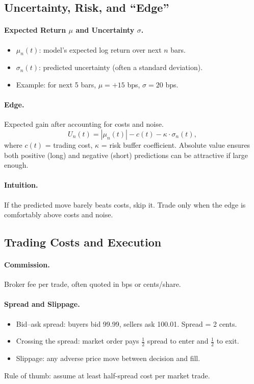 \documentclass[11pt]{article}
\begin{document}
    \subsection{Uncertainty, Risk, and ``Edge''}

    \paragraph{Expected Return $\mu$ and Uncertainty $\sigma$.}
    \begin{itemize}
        \item $\mu_n(t)$: model’s expected log return over next $n$ bars.
        \item $\sigma_n(t)$: predicted uncertainty (often a standard deviation).
        \item Example: for next 5 bars, $\mu=+15$ bps, $\sigma=20$ bps.
    \end{itemize}

    \paragraph{Edge.}
    Expected gain after accounting for costs and noise.
    \[
        U_n(t) = |\mu_n(t)| - c(t) - \kappa \cdot \sigma_n(t),
    \]
    where $c(t)$ = trading cost, $\kappa$ = risk buffer coefficient.
    Absolute value ensures both positive (long) and negative (short) predictions can be attractive if large enough.

    \paragraph{Intuition.}
    If the predicted move barely beats costs, skip it. Trade only when the edge is comfortably above costs and noise.

    \subsection{Trading Costs and Execution}

    \paragraph{Commission.}
    Broker fee per trade, often quoted in bps or cents/share.

    \paragraph{Spread and Slippage.}
    \begin{itemize}
        \item Bid--ask spread: buyers bid 99.99, sellers ask 100.01. Spread = 2 cents.
        \item Crossing the spread: market order pays $\tfrac{1}{2}$ spread to enter and $\tfrac{1}{2}$ to exit.
        \item Slippage: any adverse price move between decision and fill.
    \end{itemize}
    Rule of thumb: assume at least half-spread cost per market trade.
\end{document}
